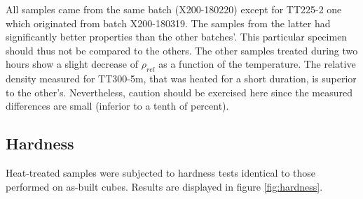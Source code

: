  \begin{center}
\begin{table}[ht]
\noindent{}

\caption[RODIA relative density results for the heat treated cubes]{RODIA relative density results for the heat treated cubes}
\label{tab:densTT}
\end{table}
 \end{center}

All samples came from the same batch (X200-180220) except for TT225-2 one which originated from batch X200-180319. The samples from the latter had significantly better properties than the other batches'. This particular specimen should thus not be compared to the others. The other samples treated during two hours show a slight decrease of $\rho_{rel}$ as a function of the temperature. The relative density measured for TT300-5m, that was heated for a short duration, is superior to the other's. Nevertheless, caution should be exercised here since the measured differences are small (inferior to a tenth of percent). 

\subsection{Hardness}

Heat-treated samples were subjected to hardness tests identical to those performed on as-built cubes. Results are displayed in figure \ref{fig:hardness}.

